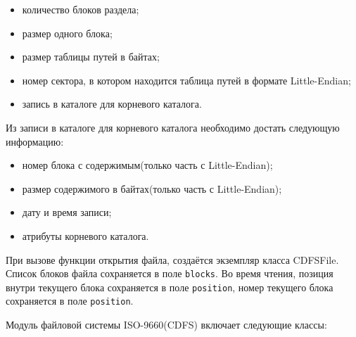 \begin{itemize}
\item количество блоков раздела;
\item размер одного блока;
\item размер таблицы путей в байтах;
\item номер сектора, в котором находится таблица путей в формате Little-Endian;
\item запись в каталоге для корневого каталога.
\end{itemize}

Из записи в каталоге для корневого каталога необходимо достать следующую информацию:
\begin{itemize}
\item номер блока с содержимым(только часть с Little-Endian);
\item размер содержимого в байтах(только часть с Little-Endian);
\item дату и время записи;
\item атрибуты корневого каталога.
\end{itemize}

При вызове функции открытия файла, создаётся экземпляр класса CDFSFile. Список блоков файла сохраняется в поле \texttt{blocks}. Во время чтения, позиция внутри текущего блока сохраняется в поле \texttt{position}, номер текущего блока сохраняется в поле \texttt{position}.

Модуль файловой системы ISO-9660(CDFS) включает следующие классы:

